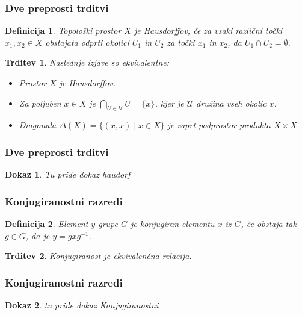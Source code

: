 \documentclass{beamer}
\newtheorem{trditev}{Trditev}
\newtheorem{definicija}{Definicija}
\newtheorem{dokaz}{Dokaz}
\begin{document}
\begin{frame}
\frametitle{Dve preprosti trditvi}

\begin{definicija}
    Topološki prostor $X$ je \emph{Hausdorffov}, če za vsaki različni točki $x_1, x_2 \in X$ obstajata odprti okolici $U_1$ in $U_2$ za točki $x_1$ in $x_2$, da $U_1 \cap U_2 = \emptyset$.
\end{definicija}
\pause

\begin{trditev}
    Naslednje izjave so ekvivalentne:
    \pause
    \begin{itemize}
        \item[\rm (i)] Prostor $X$ je Hausdorffov.
        \pause 
        \item[\rm (ii)] Za poljuben $x \in X$ je $\bigcap_{U \in \mathcal{U}} \overline{U} = \{x\}$, kjer je $\mathcal{U}$ družina vseh okolic $x$.
        \pause 
        \item[\rm (iii)] Diagonala $\Delta(X) = \{(x,x) \mid x \in X \} $ je zaprt podprostor produkta $X \times X$
    \end{itemize}
\end{trditev}

\end{frame}

\begin{frame}
\frametitle{Dve preprosti trditvi}

\begin{dokaz}
    Tu pride dokaz haudorf
\end{dokaz}

\end{frame}



\begin{frame}
\frametitle{Konjugiranostni razredi}

\begin{definicija}
    Element $y$ grupe $G$ je \emph{konjugiran} elementu $x$ iz $G$, če obstaja tak $g \in G$, da je $y = gxg^{-1}$.
\end{definicija}
\bigskip
\pause

\begin{trditev}
    Konjugiranost je ekvivalenčna relacija.
\end{trditev}

\end{frame}


\begin{frame}
\frametitle{Konjugiranostni razredi}

\begin{dokaz}
    tu pride dokaz Konjugiranostni
\end{dokaz}

\end{frame}
\end{document}
